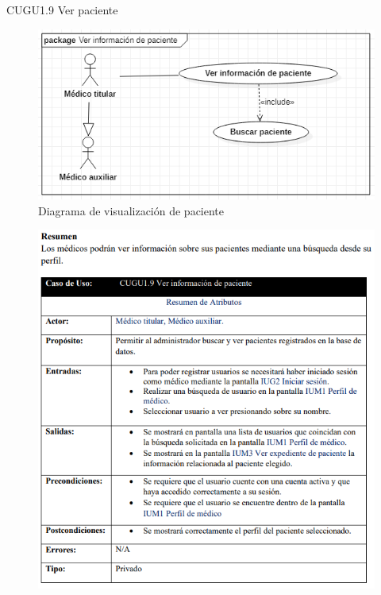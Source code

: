 \documentclass[12pt,letterpaper]{article}
\begin{document}
            \newpage
            CUGU1.9 Ver paciente 
            \begin{figure}[H]
                \centering
                \includegraphics [scale=0.5]{casosUso/verPaciente}
                \caption{Diagrama de visualización de paciente}
            \end{figure}
            \begin{figure}[H]
                \centering
                \includegraphics [scale=0.8]{specs/specVerPaciente}
            \end{figure}
\end{document}
